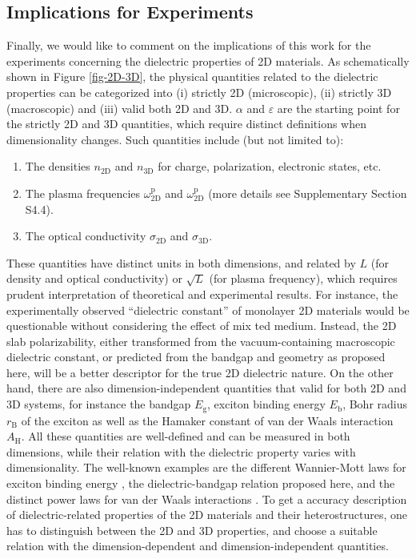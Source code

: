 \documentclass[journal=ancac3,manuscript=article,email=true,hyperref=true,keywords=false]{achemso}
\begin{document}
\subsection{Implications for Experiments}
Finally, we would like to comment on the implications of this work for
the experiments concerning the dielectric properties of 2D materials.
As schematically shown in Figure \ref{fig-2D-3D}, the physical
quantities related to the dielectric properties can be categorized
into (i) strictly 2D (microscopic), (ii) strictly 3D (macroscopic) and
(iii) valid both 2D and 3D.  $\alpha$ and $\varepsilon$ are the
starting point for the strictly 2D and 3D quantities, which require
distinct definitions when dimensionality changes. Such quantities
include (but not limited to):
\begin{enumerate}
\item The densities $n_{\mathrm{2D}}$ and $n_{\mathrm{3D}}$ for
  charge, polarization, electronic states, etc.
  
\item The plasma frequencies $\omega^{\mathrm{p}}_{\mathrm{2D}}$ and
  $\omega^{\mathrm{p}}_{\mathrm{2D}}$\cite{Nazarov_2015_2D_3D} (more
  details see Supplementary Section S4.4).

\item The optical conductivity $\sigma_{\mathrm{2D}}$ and
  $\sigma_{\mathrm{3D}}$\cite{Bechstedt_2012,Matthes_2016}.
\end{enumerate}
These quantities have distinct units in both dimensions, and related
by $L$ (for density and optical conductivity) or $\sqrt{L}$ (for
plasma frequency), which requires prudent interpretation of
theoretical and experimental results. For instance, the experimentally
observed ``dielectric constant'' of monolayer 2D materials
\cite{Ning_2015,Li_2014,Yao_2014,Wu_2015} would be questionable
without considering the effect of mix ted medium. Instead, the 2D slab
polarizability, either transformed from the vacuum-containing
macroscopic dielectric constant, or predicted from the bandgap and
geometry as proposed here, will be a better descriptor for the true 2D
dielectric nature. On the other hand, there are also
dimension-independent quantities that valid for both 2D and 3D
systems, for instance the bandgap $E_{\mathrm{g}}$, exciton binding
energy $E_{\mathrm{b}}$, Bohr radius $r_{\mathrm{B}}$ of the exciton
as well as the Hamaker constant of van der Waals interaction
$A_{\mathrm{H}}$. All these quantities are well-defined and can be
measured in both dimensions, while their relation with the dielectric
property varies with dimensionality. The well-known examples are the
different Wannier-Mott laws for exciton binding energy
\cite{Olsen_2016_hydrogen}, the dielectric-bandgap relation
proposed here, and the distinct power laws for van der Waals
interactions \cite{Gobre_2013}. To get a accuracy description of
dielectric-related properties of the 2D materials and their
heterostructures, one has to distinguish between the 2D and 3D
properties, and choose a suitable relation with the
dimension-dependent and dimension-independent quantities.
\end{document}
